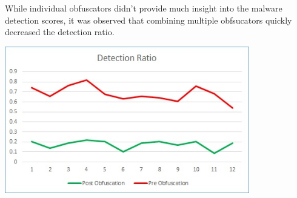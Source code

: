While individual obfuscators didn't provide much insight into the malware detection scores, it was observed that combining multiple obfsucators quickly decreased the detection ratio. 

 	 \vspace{3mm}
 	 \begin{center}
 	 	\includegraphics[width=0.8\textwidth]{detectionRatio.jpg}
 	 	\label{detection}
 	 \end{center}
 	 \vspace{3mm}